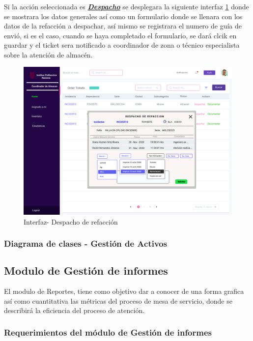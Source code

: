 Si la acción  seleccionada es  \textbf{\textit{\underline{Despacho}}} se desplegara la siguiente interfaz \ref{fig:DESALM} donde se mostrara los datos generales así como un formulario donde se llenara con los datos de la refacción a despachar, así mismo se registrara el numero de guía de envió, si es el caso, cuando se haya completado el formulario, se dará clcik en guardar y el ticket sera notificado a coordinador de zona o técnico especialista sobre la atención de almacén.

\begin{figure}[H]
	\centering
	\includegraphics[width=1.1\textwidth]{Capitulo4/Img/GestionAc/Almacen-despachar}
	\caption{Interfaz- Despacho de refacción  }
	\label{fig:DESALM}
\end{figure}






\subsubsection{Diagrama de clases - Gestión de Activos}



\newpage
\subsection{Modulo de Gestión de informes}
El modulo de Reportes, tiene como objetivo dar a conocer de una forma grafica así como cuantitativa las métricas del proceso de mesa de servicio, 
donde se describirá la eficiencia del proceso de atención.
\subsubsection{Requerimientos del módulo de Gestión de informes}

